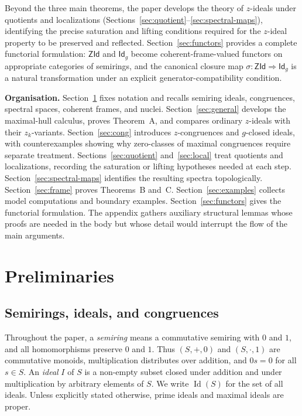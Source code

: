 \documentclass[11pt,leqno]{amsart}
\theoremstyle{plain}
\theoremstyle{definition}
\theoremstyle{remark}
\numberwithin{equation}{section}
\DeclareMathOperator{\Id}{Id}
\newcommand{\ZId}{\mathsf{ZId}}
\newcommand{\GCl}{\mathsf{Id}_{g}}
\begin{document}
Beyond the three main theorems, the paper develops the theory of
$z$-ideals under quotients and localizations
(Sections~\ref{sec:quotient}--\ref{sec:spectral-maps}),
identifying the precise saturation and lifting conditions required
for the $z$-ideal property to be preserved and reflected.
Section~\ref{sec:functors} provides a complete functorial formulation:
$\ZId$ and $\GCl$ become coherent-frame-valued functors on appropriate
categories of semirings, and the canonical closure map
$\sigma\colon\ZId\Rightarrow\GCl$ is a natural transformation under
an explicit generator-compatibility condition.

\medskip

\textbf{Organisation.}
Section~\ref{sec:prelim} fixes notation and recalls semiring ideals,
congruences, spectral spaces, coherent frames, and nuclei.
Section~\ref{sec:general} develops the maximal-hull calculus,
proves Theorem~A, and compares ordinary $z$-ideals with their
$z_k$-variants.
Section~\ref{sec:cong} introduces $z$-congruences and $g$-closed ideals,
with counterexamples showing why zero-classes of maximal congruences
require separate treatment.
Sections~\ref{sec:quotient} and~\ref{sec:local} treat quotients and
localizations, recording the saturation or lifting hypotheses needed
at each step.
Section~\ref{sec:spectral-maps} identifies the resulting spectra
topologically.
Section~\ref{sec:frame} proves Theorems~B and~C.
Section~\ref{sec:examples} collects model computations and
boundary examples.
Section~\ref{sec:functors} gives the functorial formulation.
The appendix gathers auxiliary structural lemmas whose proofs
are needed in the body but whose detail would interrupt the flow
of the main arguments.

\section{Preliminaries}\label{sec:prelim}

\subsection{Semirings, ideals, and congruences}

Throughout the paper, a \emph{semiring} means a commutative semiring
with $0$ and $1$, and all homomorphisms preserve $0$ and $1$.
Thus $(S,+,0)$ and $(S,\cdot,1)$ are commutative monoids,
multiplication distributes over addition, and $0s=0$ for all $s\in S$.
An \emph{ideal} $I$ of $S$ is a non-empty subset closed under
addition and under multiplication by arbitrary elements of $S$.
We write $\Id(S)$ for the set of all ideals.
Unless explicitly stated otherwise, prime ideals and maximal ideals
are proper.
\end{document}
